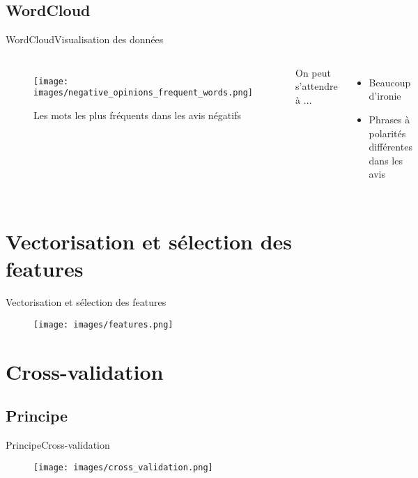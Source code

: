 \documentclass[usenames,dvipsnames]{beamer}
\begin{document}
\subsection{WordCloud}
\begin{frame}{WordCloud}{Visualisation des données}
\begin{columns}
\begin{figure}[!ht]
    \centering
    \texttt{[image: images/negative\_opinions\_frequent\_words.png]}
    \caption{Les mots les plus fréquents dans les avis négatifs}
\end{figure}
On peut s'attendre à $\dots$
\begin{itemize}
    \item Beaucoup d'ironie
    \item Phrases à polarités différentes dans les avis
\end{itemize}
\end{columns}
\end{frame}

\section{Vectorisation et sélection des features}
\begin{frame}{Vectorisation et sélection des features}
\begin{figure}[!ht]
    \centering
    \texttt{[image: images/features.png]}
\end{figure}
\end{frame}

\section{Cross-validation}
\subsection{Principe}
\begin{frame}{Principe}{Cross-validation}
\begin{figure}[!ht]
  \centering
  \texttt{[image: images/cross\_validation.png]}
\end{figure}
\end{frame}
\end{document}
